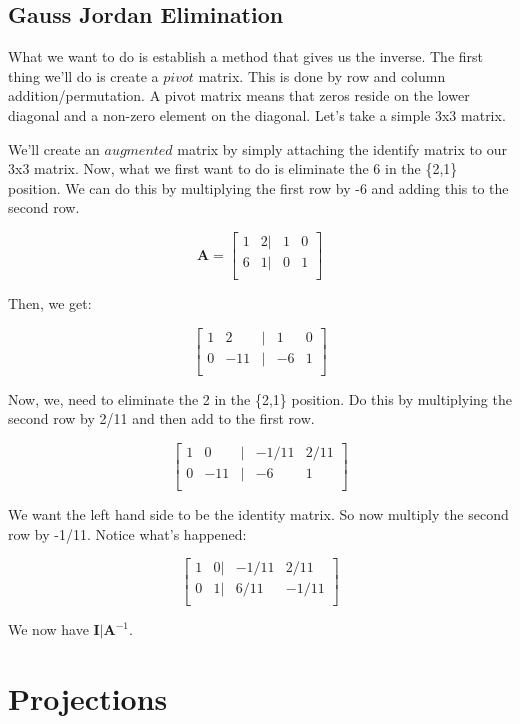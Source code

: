 \documentclass[
]{book}
\begin{document}
\subsection{Gauss Jordan Elimination}\label{gauss-jordan-elimination}

What we want to do is establish a method that gives us the inverse. The
first thing we'll do is create a \(\textit{pivot}\) matrix. This is done
by row and column addition/permutation. A pivot matrix means that zeros
reside on the lower diagonal and a non-zero element on the diagonal.
Let's take a simple 3x3 matrix.

We'll create an \(\textit{augmented}\) matrix by simply attaching the
identify matrix to our 3x3 matrix. Now, what we first want to do is
eliminate the 6 in the \{2,1\} position. We can do this by multiplying the
first row by -6 and adding this to the second row.

\[
\textbf{A}=\begin{bmatrix}
1 & 2 |& 1 & 0\\
6 & 1 |& 0 & 1\\
\end{bmatrix}
\]

Then, we get:

\[
\begin{bmatrix}
1 & 2 &  |& 1 & 0\\
0 & -11& |& -6 & 1\\
\end{bmatrix}
\]

Now, we, need to eliminate the 2 in the \{2,1\} position. Do this by
multiplying the second row by 2/11 and then add to the first row.

\[
\begin{bmatrix}
1 &  0  &|& -1/11 & 2/11\\
0 & -11 &|& -6 &    1\\
\end{bmatrix}
\]

We want the left hand side to be the identity matrix. So now multiply
the second row by -1/11. Notice what's happened:

\[
\begin{bmatrix}
1 &  0  |& -1/11 & 2/11\\
0 &  1|&    6/11 & -1/11\\
\end{bmatrix}
\]

We now have \(\textbf{I}|\textbf{A}^{-1}\).

\section{Projections}\label{projections}
\end{document}
